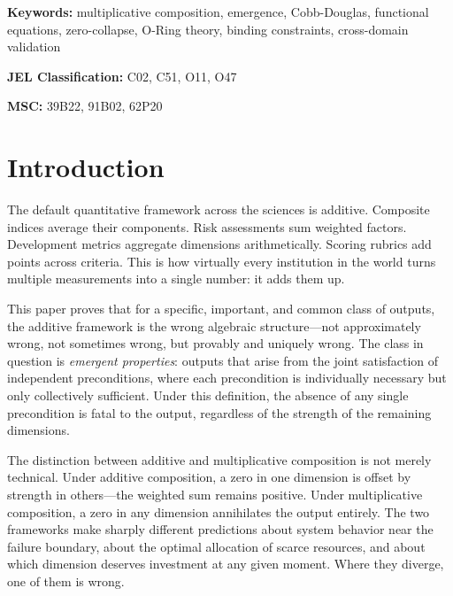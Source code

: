 \documentclass[12pt, a4paper]{article}
\theoremstyle{definition}
\theoremstyle{remark}
\begin{document}
\vspace{1em}
\noindent\textbf{Keywords:} multiplicative composition, emergence, Cobb-Douglas, functional equations, zero-collapse, O-Ring theory, binding constraints, cross-domain validation

\vspace{0.5em}
\noindent\textbf{JEL Classification:} C02, C51, O11, O47

\vspace{0.5em}
\noindent\textbf{MSC:} 39B22, 91B02, 62P20

\newpage
\tableofcontents
\newpage

\section{Introduction}\label{sec:intro}

The default quantitative framework across the sciences is additive. Composite indices average their components. Risk assessments sum weighted factors. Development metrics aggregate dimensions arithmetically. Scoring rubrics add points across criteria. This is how virtually every institution in the world turns multiple measurements into a single number: it adds them up.

This paper proves that for a specific, important, and common class of outputs, the additive framework is the wrong algebraic structure---not approximately wrong, not sometimes wrong, but provably and uniquely wrong. The class in question is \textit{emergent properties}: outputs that arise from the joint satisfaction of independent preconditions, where each precondition is individually necessary but only collectively sufficient. Under this definition, the absence of any single precondition is fatal to the output, regardless of the strength of the remaining dimensions.

The distinction between additive and multiplicative composition is not merely technical. Under additive composition, a zero in one dimension is offset by strength in others---the weighted sum remains positive. Under multiplicative composition, a zero in any dimension annihilates the output entirely. The two frameworks make sharply different predictions about system behavior near the failure boundary, about the optimal allocation of scarce resources, and about which dimension deserves investment at any given moment. Where they diverge, one of them is wrong.
\end{document}
